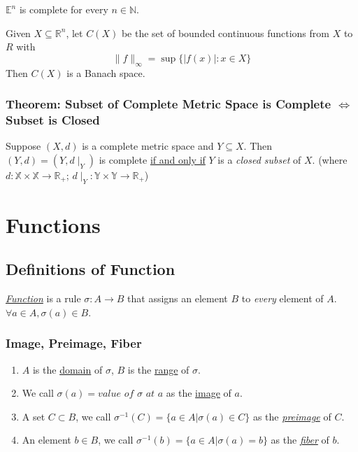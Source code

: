 \documentclass[11pt]{elegantbook}
\begin{document}
\begin{theorem}
    $\mathbb{E}^n$ is complete for every $n \in \mathbb{N}$.
\end{theorem}

\begin{theorem}
    Given $X \subseteq \mathbb{R}^n$, let $C(X)$ be the set of bounded continuous
    functions from $X$ to $R$ with $$\|f\|_\infty=\sup\{|f(x)|:x\in X\}$$
    Then $C(X)$ is a Banach space.
\end{theorem}

\subsection{Theorem: Subset of Complete Metric Space is Complete $\Leftrightarrow$ Subset is Closed}
\begin{theorem}
    Suppose $(X, d)$ is a complete metric space and $Y \subseteq X$. Then $(Y, d) = (Y, d\mid_Y)$ is complete \underline{if and only if} $Y$ is a \textit{closed subset} of $X$. (where $d: \mathbb{X}\times \mathbb{X}\rightarrow \mathbb{R}_+$; $d\mid_Y: \mathbb{Y}\times \mathbb{Y}\rightarrow \mathbb{R}_+$)
\end{theorem}




\chapter{Functions}
\section{Definitions of Function}
\begin{definition}[Function]
    \normalfont
    \underline{\textit{Function}} is a rule $\sigma:A\rightarrow B$ that assigns an element $B$ to \textit{every} element of $A$. $\forall a\in A, \sigma(a)\in B$.
\end{definition}
\subsection{Image, Preimage, Fiber}
\begin{definition}
    \normalfont
\begin{enumerate}
    \item $A$ is the \underline{domain} of $\sigma$, $B$ is the \underline{range} of $\sigma$.
    \item We call $\sigma (a)= \textit{value of } \sigma\textit{ at } a$ as the \underline{image} of $a$.
    \item A set $C\subset B$, we call $\sigma^{-1}(C)=\{a\in A| \sigma(a)\in C\}$ as the \textit{\underline{preimage}} of $C$.
    \item An element $b\in B$, we call $\sigma^{-1}(b)=\{a\in A| \sigma(a)=b \}$ as the \textit{\underline{fiber}} of $b$.
\end{enumerate}
\end{definition}
\end{document}
